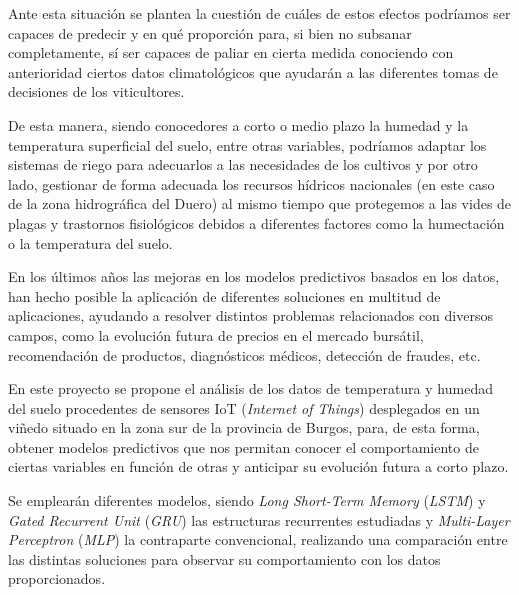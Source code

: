 Ante esta situación se plantea la cuestión de cuáles de estos efectos podríamos ser capaces de predecir
y en qué proporción para, si bien no subsanar completamente, sí ser capaces de paliar en cierta medida
conociendo con anterioridad ciertos datos climatológicos que ayudarán a las diferentes tomas de decisiones de 
los viticultores.

De esta manera, siendo conocedores a corto o medio plazo la humedad y la temperatura superficial del suelo,
entre otras variables, podríamos adaptar los sistemas de riego para adecuarlos a las necesidades de los
cultivos y por otro lado, gestionar de forma adecuada los recursos hídricos nacionales (en este caso
de la zona hidrográfica del Duero) al mismo tiempo que protegemos a las vides de plagas y trastornos fisiológicos 
debidos a diferentes factores como la humectación o la temperatura del suelo.

En los últimos años las mejoras en los modelos predictivos basados en los datos, han hecho posible la aplicación
de diferentes soluciones en multitud de aplicaciones, ayudando a resolver distintos problemas relacionados con 
diversos campos, como la evolución futura de precios en el mercado bursátil, recomendación de productos, diagnósticos médicos, detección de fraudes, etc.

En este proyecto se propone el análisis de los datos de temperatura y humedad del suelo procedentes de 
sensores IoT (\textit{Internet of Things}) desplegados en un viñedo situado en la zona sur de la provincia de Burgos, para, de esta forma,
obtener modelos predictivos que nos permitan conocer el comportamiento de ciertas variables en función de otras
y anticipar su evolución futura a corto plazo.

Se emplearán diferentes modelos, siendo \textit{Long Short-Term Memory} 
(\textit{LSTM}) y \textit{Gated Recurrent Unit} (\textit{GRU}) las estructuras recurrentes estudiadas y 
\textit{Multi-Layer Perceptron} (\textit{MLP}) la contraparte convencional, realizando una comparación
entre las distintas soluciones para observar su comportamiento con los datos proporcionados.

